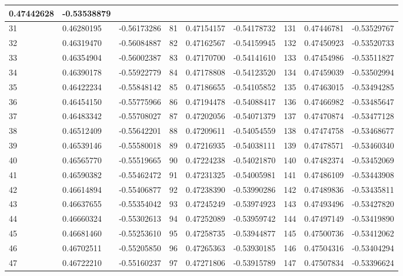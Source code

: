 \begin{table}[h]
\begin{center}
{\begin{tabular}{|l|l|l||l|l|l||l|l|l|}
    0.47442628 & -0.53538879\\\hline
    31 & 0.46280195 & -0.56173286 & 81 & 0.47154157 & -0.54178732 & 131 &
    0.47446781 & -0.53529767\\\hline
    32 & 0.46319470 & -0.56084887 & 82 & 0.47162567 & -0.54159945 & 132 &
    0.47450923 & -0.53520733\\\hline
    33 & 0.46354904 & -0.56002387 & 83 & 0.47170700 & -0.54141610 & 133 &
    0.47454986 & -0.53511827\\\hline
    34 & 0.46390178 & -0.55922779 & 84 & 0.47178808 & -0.54123520 & 134 &
    0.47459039 & -0.53502994\\\hline
    35 & 0.46422234 & -0.55848142 & 85 & 0.47186655 & -0.54105852 & 135 &
    0.47463015 & -0.53494285\\\hline
    36 & 0.46454150 & -0.55775966 & 86 & 0.47194478 & -0.54088417 & 136 &
    0.47466982 & -0.53485647\\\hline
    37 & 0.46483342 & -0.55708027 & 87 & 0.47202056 & -0.54071379 & 137 &
    0.47470874 & -0.53477128\\\hline
    38 & 0.46512409 & -0.55642201 & 88 & 0.47209611 & -0.54054559 & 138 &
    0.47474758 & -0.53468677\\\hline
    39 & 0.46539146 & -0.55580018 & 89 & 0.47216935 & -0.54038111 & 139 &
    0.47478571 & -0.53460340\\\hline
    40 & 0.46565770 & -0.55519665 & 90 & 0.47224238 & -0.54021870 & 140 &
    0.47482374 & -0.53452069\\\hline
    41 & 0.46590382 & -0.55462472 & 91 & 0.47231325 & -0.54005981 & 141 &
    0.47486109 & -0.53443908\\\hline
    42 & 0.46614894 & -0.55406877 & 92 & 0.47238390 & -0.53990286 & 142 &
    0.47489836 & -0.53435811\\\hline
    43 & 0.46637655 & -0.55354042 & 93 & 0.47245249 & -0.53974923 & 143 &
    0.47493496 & -0.53427820\\\hline
    44 & 0.46660324 & -0.55302613 & 94 & 0.47252089 & -0.53959742 & 144 &
    0.47497149 & -0.53419890\\\hline
    45 & 0.46681460 & -0.55253610 & 95 & 0.47258735 & -0.53944877 & 145 &
    0.47500736 & -0.53412062\\\hline
    46 & 0.46702511 & -0.55205850 & 96 & 0.47265363 & -0.53930185 & 146 &
    0.47504316 & -0.53404294\\\hline
    47 & 0.46722210 & -0.55160237 & 97 & 0.47271806 & -0.53915789 & 147 &
    0.47507834 & -0.53396624\\\hline

\end{tabular}}
\end{center}
\end{table}
